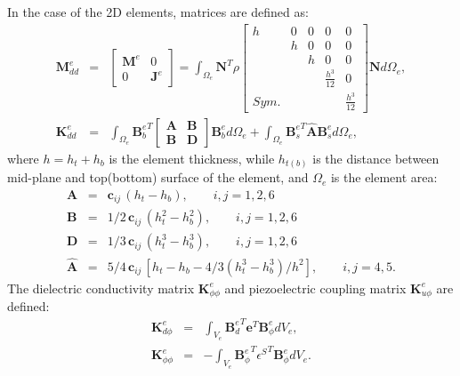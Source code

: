 \documentclass[sensors,article,submit,moreauthors,pdftex]{Definitions/mdpi}
\begin{document}
In the case of the 2D elements, matrices are defined as:
\begin{eqnarray}
\textbf{M}_{dd}^e & = &
\left [
\begin{array}{cc}
\textbf{M}^e & 0\\
0 & \textbf{J}^e
\end{array}
\right] =
\int_{\Omega_e}\textbf{N}^T\rho 
\left [
\begin{array}{ccccc}
h & 0 & 0 & 0 & 0 \\
  & h & 0 & 0 & 0 \\
 &  & h & 0 & 0\\
 &  &  & \frac{h^3}{12} & 0\\
Sym. &  &  &  & \frac{h^3}{12}
\end{array} \right]
\textbf{N} d\Omega_e,\\
\textbf{K}_{dd}^e & = & \int_{\Omega_e}{\textbf{B}_b^e}^T
\left[
\begin{array}{cc}
\textbf{A} & \textbf{B}\\
\textbf{B} & \textbf{D}
\end{array} \right]
\textbf{B}_b^ed \Omega_e+\int_{\Omega_e}{\textbf{B}_s^e}^T\hat{\textbf{A}}\textbf{B}_s^ed \Omega_e,
\end{eqnarray}
where \(h=h_t+h_b\) is the element thickness, while \(h_{t(b)}\) is the distance between mid-plane and top(bottom) surface of the element, and \(\Omega_e\) is the element area:
\begin{eqnarray}
\textbf{A} & = & \textbf{c}_{ij}\,(h_t-h_b),\qquad i,j=1,2,6\nonumber\\
\textbf{B} & = & 1/2\, \textbf{c}_{ij}\,(h_t^2-h_b^2),\qquad i,j=1,2,6\nonumber\\
\textbf{D} & = & 1/3\, \textbf{c}_{ij}\,(h_t^3-h_b^3),\qquad i,j=1,2,6\nonumber\\
\hat{\textbf{A}} & = & 5/4\, \textbf{c}_{ij}\,\left[h_t-h_b-4/3\left(h_t^3-h_b^3\right)/h^2\right],\qquad i,j=4,5.
\end{eqnarray}
The dielectric conductivity matrix \(\textbf{K}_{\phi \phi}^e\) and piezoelectric coupling matrix \(\textbf{K}_{u \phi}^e\) are defined:
\begin{eqnarray}
\textbf{K}_{d\phi}^e & = & \int_{V_e}{\textbf{B}_d^e}^T\textbf{e}^T \textbf{B}_{\phi}^ed V_e,\\
\textbf{K}_{\phi \phi}^e & = & -\int_{V_e}{\textbf{B}_{\phi}^e}^T 
{\textbf{\(\epsilon\)}^S}^T \textbf{B}_{\phi}^edV_e.
\end{eqnarray}
\end{document}
